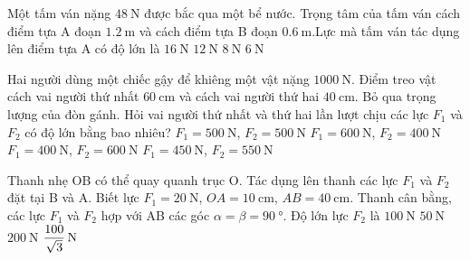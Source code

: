 \begin{ex}
Một tấm ván nặng $\SI{48}{\newton}$ được bắc qua một bể nước. Trọng tâm của tấm ván cách điểm tựa A đoạn $\SI{1.2}{\meter}$ và cách điểm tựa B đoạn $\SI{0.6}{\meter}$.Lực mà tấm ván tác dụng lên điểm tựa A có độ lớn là 	
	\choice
	{\True $\SI{16}{\newton}$}
	{$\SI{12}{\newton}$}
	{$\SI{8}{\newton}$}
	{$\SI{6}{\newton}$}
\end{ex}
\begin{ex}
	Hai người dùng một chiếc gậy để khiêng một vật nặng $\SI{1000}{\newton}$. Điểm treo vật cách vai người thứ nhất $\SI{60}{\centi\meter}$ và cách vai người thứ hai $\SI{40}{\centi\meter}$. Bỏ qua trọng lượng của đòn gánh. Hỏi vai người thứ nhất và thứ hai lần lượt chịu các lực $F_1$ và $F_2$ có độ lớn bằng bao nhiêu?
	\choice
	{$F_1=\SI{500}{\newton}$, $F_2=\SI{500}{\newton}$}
	{$F_1=\SI{600}{\newton}$, $F_2=\SI{400}{\newton}$}
	{\True $F_1=\SI{400}{\newton}$, $F_2=\SI{600}{\newton}$}
	{$F_1=\SI{450}{\newton}$, $F_2=\SI{550}{\newton}$}
\end{ex}
\begin{ex}
	Thanh nhẹ OB có thể quay quanh trục O. Tác dụng lên thanh các lực $F_1$ và $F_2$ đặt tại B và A. Biết lực $F_1=\SI{20}{\newton}$, $OA=\SI{10}{\centi\meter}$, $AB=\SI{40}{\centi\meter}$. Thanh cân bằng, các lực $F_1$ và $F_2$ hợp với AB các góc $\alpha=\beta=\SI{90}{\degree}$. Độ lớn lực $F_2$ là
	\choice
	{\True $\SI{100}{\newton}$}
	{$\SI{50}{\newton}$}
	{$\SI{200}{\newton}$}
	{$\xsi{\dfrac{100}{\sqrt{3}}}{\newton}$}
\end{ex}
